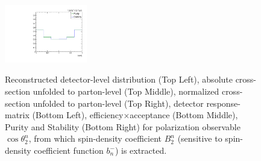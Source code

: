 \begin{figure}[htb]
\begin{center}
 \includegraphics[width=0.32\textwidth]{fig_fullRun2UL/unfolding/combined/PurStab_b2n.pdf} \\
\caption{Reconstructed detector-level distribution (Top Left), absolute cross-section unfolded to parton-level (Top Middle), normalized cross-section unfolded to parton-level (Top Right), detector response-matrix (Bottom Left), efficiency$\times$acceptance (Bottom Middle), Purity and Stability (Bottom Right) for polarization observable $\cos\theta_{2}^{n}$, from which spin-density coefficient $B_{2}^{n}$ (sensitive to spin-density coefficient function $b_n^{-}$) is extracted.}
\label{fig:b2n}
\end{center}
\end{figure}
\clearpage

